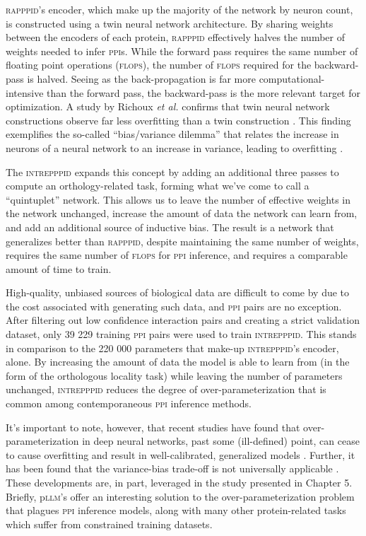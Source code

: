 \textsc{rapppid}'s encoder, which make up the majority of the network by neuron count, is constructed using a twin neural network architecture. By sharing weights between the encoders of each protein, \textsc{rapppid} effectively halves the number of weights needed to infer \textsc{ppi}s. While the forward pass requires the same number of floating point operations (\textsc{flops}), the number of \textsc{flops} required for the backward-pass is halved. Seeing as the back-propagation is far more computational-intensive than the forward pass, the backward-pass is the more relevant target for optimization. A study by Richoux \textit{et al.} confirms that twin neural network constructions observe far less overfitting than a twin construction \cite{richoux}. This finding exemplifies the so-called ``bias/variance dilemma'' that relates the increase in neurons of a neural network to an increase in variance, leading to overfitting \cite{bias_variance}.

The \textsc{intrepppid} expands this concept by adding an additional three passes to compute an orthology-related task, forming what we've come to call a ``quintuplet'' network. This allows us to leave the number of effective weights in the network unchanged, increase the amount of data the network can learn from, and add an additional source of inductive bias. The result is a network that generalizes better than \textsc{rapppid}, despite maintaining the same number of weights, requires the same number of \textsc{flops} for \textsc{ppi} inference, and requires a comparable amount of time to train.

High-quality, unbiased sources of biological data are difficult to come by due to the cost associated with generating such data, and \textsc{ppi} pairs are no exception. After filtering out low confidence interaction pairs and creating a strict validation dataset, only 39 229 training \textsc{ppi} pairs were used to train \textsc{intrepppid}. This stands in comparison to the 220 000 parameters that make-up \textsc{intrepppid}'s encoder, alone. By increasing the amount of data the model is able to learn from (in the form of the orthologous locality task) while leaving the number of parameters unchanged, \textsc{intrepppid} reduces the degree of over-parameterization that is common among contemporaneous \textsc{ppi} inference methods.

It's important to note, however, that recent studies have found that over-parameterization in deep neural networks, past some (ill-defined) point, can cease to cause overfitting and result in well-calibrated, generalized models \cite{Baldi_2024}. Further, it has been found that the variance-bias trade-off is not universally applicable \cite{bias_variance_update}. These developments are, in part, leveraged in the study presented in Chapter 5. Briefly, p\textsc{llm}'s offer an interesting solution to the over-parameterization problem that plagues \textsc{ppi} inference models, along with many other protein-related tasks which suffer from constrained training datasets.


